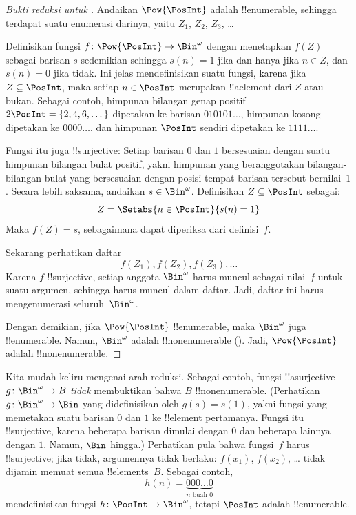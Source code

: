 \documentclass[../../../include/open-logic-section]{subfiles}
\begin{document}
\begin{proof}[Bukti reduksi untuk {}]
Andaikan $\Pow{\PosInt}$ adalah !!{enumerable}, sehingga terdapat suatu
enumerasi darinya, yaitu $Z_{1}$, $Z_{2}$, $Z_{3}$, \dots

Definisikan fungsi $f \colon \Pow{\PosInt} \to \Bin^\omega$ dengan menetapkan
$f(Z)$ sebagai barisan $s$ sedemikian sehingga $s(n) = 1$ jika dan hanya jika
$n \in Z$, dan $s(n) = 0$ jika tidak. Ini jelas mendefinisikan
suatu fungsi, karena jika $Z \subseteq \PosInt$, maka setiap $n \in \PosInt$
merupakan !!a{element} dari $Z$ atau bukan. Sebagai contoh, himpunan bilangan
genap positif $2\PosInt = \{2, 4, 6, \dots\}$ dipetakan ke barisan
$010101\dots$, himpunan kosong dipetakan ke $0000\dots$, dan himpunan
$\PosInt$ sendiri dipetakan ke $1111\dots$.

Fungsi itu juga !!{surjective}: Setiap barisan $0$ dan $1$ bersesuaian dengan
suatu himpunan bilangan bulat positif, yakni himpunan yang beranggotakan
bilangan-bilangan bulat yang bersesuaian dengan posisi tempat barisan tersebut
bernilai~$1$. Secara lebih saksama, andaikan $s \in \Bin^\omega$. Definisikan
$Z \subseteq \PosInt$ sebagai:
\[
Z = \Setabs{n \in \PosInt}{s(n) = 1}
\]
Maka $f(Z) = s$, sebagaimana dapat diperiksa dari definisi~$f$.

Sekarang perhatikan daftar
\[
f(Z_1), f(Z_2), f(Z_3), \dots
\]
Karena $f$ !!{surjective}, setiap anggota $\Bin^\omega$ harus muncul sebagai
nilai~$f$ untuk suatu argumen, sehingga harus muncul dalam daftar. Jadi,
daftar ini harus mengenumerasi seluruh~$\Bin^\omega$.

Dengan demikian, jika $\Pow{\PosInt}$ !!{enumerable}, maka $\Bin^\omega$ juga
!!{enumerable}. Namun, $\Bin^\omega$ adalah !!{nonenumerable}
(). Jadi, $\Pow{\PosInt}$ adalah
!!{nonenumerable}.
\end{proof}

\begin{explain}
Kita mudah keliru mengenai arah reduksi. Sebagai contoh, fungsi
!!a{surjective} $g \colon \Bin^\omega \to B$ \emph{tidak} membuktikan bahwa
$B$ !!{nonenumerable}. (Perhatikan $g \colon \Bin^\omega \to \Bin$ yang
didefinisikan oleh $g(s) = s(1)$, yakni fungsi yang memetakan suatu barisan
$0$ dan $1$ ke !!{element} pertamanya. Fungsi itu !!{surjective}, karena
beberapa barisan dimulai dengan $0$ dan beberapa lainnya dengan $1$. Namun,
$\Bin$ hingga.) Perhatikan pula bahwa fungsi~$f$ harus !!{surjective}; jika
tidak, argumennya tidak berlaku: $f(x_1)$, $f(x_2)$, \dots{} tidak dijamin
memuat semua !!{element}s~$B$. Sebagai contoh,
\[
h(n) = \underbrace{000\dots0}_{\text{$n$ buah $0$}}
\]
mendefinisikan fungsi $h\colon \PosInt \to \Bin^\omega$, tetapi $\PosInt$
adalah !!{enumerable}.
\end{explain}
\end{document}
